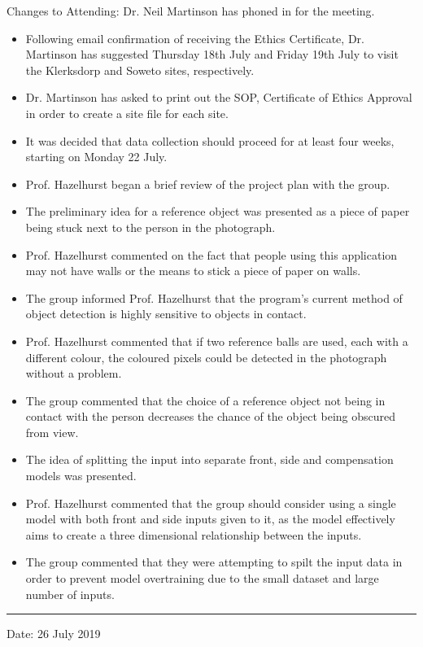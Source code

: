 \documentclass[conference, onecolumn]{IEEEtran}
\begin{document}
Changes to Attending: Dr. Neil Martinson has phoned in for the meeting.
\begin{itemize}
	\item Following email confirmation of receiving the Ethics Certificate, Dr. Martinson has suggested Thursday 18th July and Friday 19th July to visit the Klerksdorp and Soweto sites, respectively.
	\item Dr. Martinson has asked to print out the SOP, Certificate of Ethics Approval in order to create a site file for each site.
	\item It was decided that data collection should proceed for at least four weeks, starting on Monday 22 July.
	\item Prof. Hazelhurst began a brief review of the project plan with the group.
	\item The preliminary idea for a reference object was presented as a piece of paper being stuck next to the person in the photograph.
	\item Prof. Hazelhurst commented on the fact that people using this application may not have walls or the means to stick a piece of paper on walls.
	\item The group informed Prof. Hazelhurst that the program's current method of object detection is highly sensitive to objects in contact.
	\item Prof. Hazelhurst commented that if two reference balls are used, each with a different colour, the coloured pixels could be detected in the photograph without a problem.
	\item The group commented that the choice of a reference object not being in contact with the person decreases the chance of the object being obscured from view.
	\item The idea of splitting the input into separate front, side and compensation models was presented.
	\item Prof. Hazelhurst commented that the group should consider using a single model with both front and side inputs given to it, as the model effectively aims to create a three dimensional relationship between the inputs.
	\item The group commented that they were attempting to spilt the input data in order to prevent model overtraining due to the small dataset and large number of inputs.
\end{itemize}

\rule{\linewidth}{2pt}

Date: 26 July 2019
\end{document}
